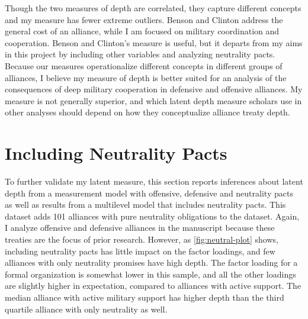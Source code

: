 \documentclass[12pt]{article}
\begin{document}
Though the two measures of depth are correlated, they capture different concepts and my measure has fewer extreme outliers. 
Benson and Clinton address the general cost of an alliance, while I am focused on military coordination and cooperation. 
Benson and Clinton's measure is useful, but it departs from my aims in this project by including other variables and analyzing neutrality pacts. 
Because our measures operationalize different concepts in different groups of alliances, I believe my measure of depth is better suited for an analysis of the consequences of deep military cooperation in defensive and offensive alliances. 
My measure is not generally superior, and which latent depth measure scholars use in other analyses should depend on how they conceptualize alliance treaty depth. 


\section{Including Neutrality Pacts}

To further validate my latent measure, this section reports inferences about latent depth from a measurement model with offensive, defensive and neutrality pacts as well as results from a multilevel model that includes neutrality pacts. 
This dataset adds 101 alliances with pure neutrality obligations to the dataset. 
Again, I analyze offensive and defensive alliances in the manuscript because these treaties are the focus of prior research. 
However, as \autoref{fig:neutral-plot} shows, including neutrality pacts has little impact on the factor loadings, and few alliances with only neutrality promises have high depth. 
The factor loading for a formal organization is somewhat lower in this sample, and all the other loadings are slightly higher in expectation, compared to alliances with active support. 
The median alliance with active military support has higher depth than the third quartile alliance with only neutrality as well. 
\end{document}
